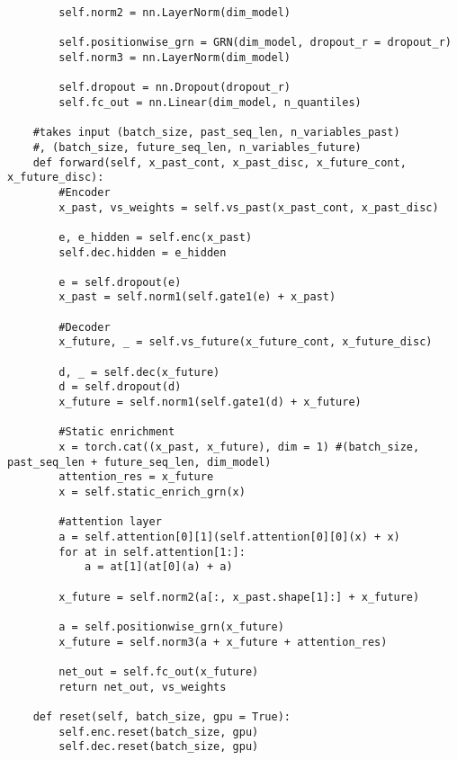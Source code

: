 \documentclass{article}
\begin{document}
\begin{lstlisting}
        self.norm2 = nn.LayerNorm(dim_model)

        self.positionwise_grn = GRN(dim_model, dropout_r = dropout_r)
        self.norm3 = nn.LayerNorm(dim_model)

        self.dropout = nn.Dropout(dropout_r)
        self.fc_out = nn.Linear(dim_model, n_quantiles)

    #takes input (batch_size, past_seq_len, n_variables_past)
    #, (batch_size, future_seq_len, n_variables_future)
    def forward(self, x_past_cont, x_past_disc, x_future_cont, x_future_disc):
        #Encoder
        x_past, vs_weights = self.vs_past(x_past_cont, x_past_disc)

        e, e_hidden = self.enc(x_past)
        self.dec.hidden = e_hidden

        e = self.dropout(e)
        x_past = self.norm1(self.gate1(e) + x_past)

        #Decoder
        x_future, _ = self.vs_future(x_future_cont, x_future_disc)

        d, _ = self.dec(x_future)
        d = self.dropout(d)
        x_future = self.norm1(self.gate1(d) + x_future)

        #Static enrichment
        x = torch.cat((x_past, x_future), dim = 1) #(batch_size, past_seq_len + future_seq_len, dim_model)
        attention_res = x_future
        x = self.static_enrich_grn(x)

        #attention layer
        a = self.attention[0][1](self.attention[0][0](x) + x)
        for at in self.attention[1:]:
            a = at[1](at[0](a) + a)

        x_future = self.norm2(a[:, x_past.shape[1]:] + x_future)

        a = self.positionwise_grn(x_future)
        x_future = self.norm3(a + x_future + attention_res)

        net_out = self.fc_out(x_future)
        return net_out, vs_weights

    def reset(self, batch_size, gpu = True):
        self.enc.reset(batch_size, gpu)
        self.dec.reset(batch_size, gpu)



\end{lstlisting}

\clearpage
\end{document}
